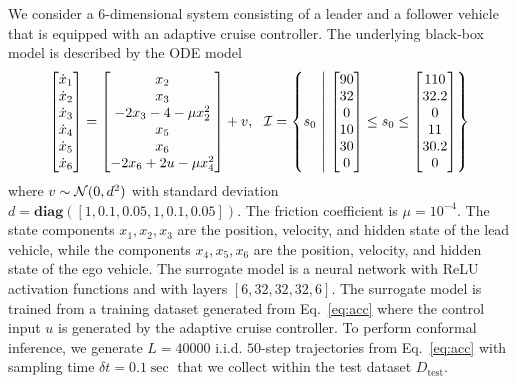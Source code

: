 We consider a $6$-dimensional system consisting of a leader and a follower vehicle that is equipped with an adaptive cruise controller. The underlying black-box model is described by the  ODE model 
\begin{equation}
\label{eq:acc}
\begin{bmatrix}\dot{x}_1\\ \dot{x}_2\\ \dot{x}_3\\ \dot{x}_4\\
\dot{x}_5\\ \dot{x}_6\end{bmatrix} =\begin{bmatrix} x_2\\ x_3\\
-2x_3-4-\mu x_2^2\\ x_5\\ x_6\\ -2x_6+2u-\mu x_4^2\end{bmatrix}+ v, \ \  \init=\left\{  \state_0\ \middle| \  \begin{bmatrix} 90\\32\\0\\10\\30\\0\end{bmatrix} \leq \state_0 \leq \begin{bmatrix} 110\\32.2\\0\\11\\30.2\\0\end{bmatrix} \right\}
\end{equation}
where $v \sim \mathcal{N}(0, d^2)$ with standard deviation $d= \mathbf{diag}([1, 0.1,  0.05,  1,  0.1,  0.05 ])$. The friction coefficient is $\mu=10^{-4}$. The state components $x_1,x_2,x_3$ are the position, velocity, and hidden state of the lead vehicle, while the components $x_4,x_5,x_6$ are the position, velocity, and hidden state of the ego vehicle. The surrogate model is a neural network with ReLU activation functions and with  layers $[6, 32,32,32,6]$. The surrogate model is trained from a training dataset generated from Eq.~\eqref{eq:acc} where the control input $u$ is generated by the adaptive cruise controller. To perform conformal inference, we generate $L=40000$  i.i.d. $50$-step trajectories from Eq.~\eqref{eq:acc} with sampling time $\delta t =0.1 \sec$ that we collect within the test dataset $D_{\text{test}}$. 
